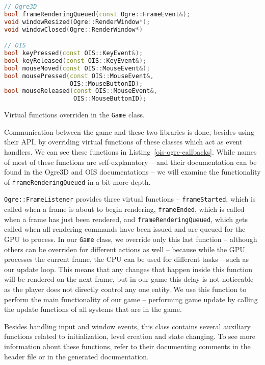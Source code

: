 \begin{listing}
    \centering
    \begin{lstlisting}[language=C++]
// Ogre3D
bool frameRenderingQueued(const Ogre::FrameEvent&);
void windowResized(Ogre::RenderWindow*);
void windowClosed(Ogre::RenderWindow*)

// OIS
bool keyPressed(const OIS::KeyEvent&);
bool keyReleased(const OIS::KeyEvent&);
bool mouseMoved(const OIS::MouseEvent&);
bool mousePressed(const OIS::MouseEvent&,
                  OIS::MouseButtonID);
bool mouseReleased(const OIS::MouseEvent&,
                   OIS::MouseButtonID);
    \end{lstlisting}
    \caption{Virtual functions overriden in the \texttt{Game} class.}
    \label{ois-ogre-callbacks}
\end{listing}

Communication between the game and these two libraries is done, besides using their API, by overriding virtual functions of these classes
which act as event handlers. We can see these functions in Listing~\ref{ois-ogre-callbacks}. While names of most of these functions are
self-explanatory -- and their documentation can be found in the Ogre3D and OIS documentations -- we will examine the functionality of
\texttt{frameRenderingQueued} in a bit more depth.

\texttt{Ogre::FrameListener} provides three virtual functions -- \texttt{frameStarted}, which is called when a frame
is about to begin rendering, \texttt{frameEnded}, which is called when a frame has just been rendered, and \texttt{frameRenderingQueued},
which gets called when all rendering commands have been issued and are queued for the GPU to process. In our \texttt{Game} class, we override
only this last function -- although others can be overriden for different actions as well -- because while the GPU processes the current
frame, the CPU can be used for different tasks -- such as our update loop. This means that any changes that happen inside this function
will be rendered on the next frame, but in our game this delay is not noticeable as the player does not directly control any one entity.
We use this function to perform the main functionality of our game -- performing game update by calling the update functions of all
systems that are in the game.

Besides handling input and window events, this class contains several auxiliary functions related to initialization, level creation and
state changing. To see more information about these functions, refer to their documenting comments in the header file or in the
generated documentation.

